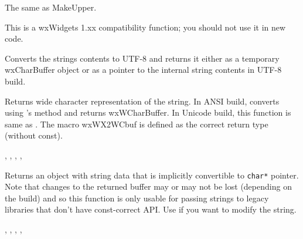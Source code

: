 The same as MakeUpper.

This is a wxWidgets 1.xx compatibility function; you should not use it in new code.


\label{wxstringutf8str}



Converts the strings contents to UTF-8 and returns it either as a temporary
wxCharBuffer object or as a pointer to the internal string contents in
UTF-8 build.


\label{wxstringwcstr}



Returns wide character representation of the string.
In ANSI build, converts using 's 
method and returns wxWCharBuffer. In Unicode build, this function is same
as .
The macro wxWX2WCbuf is defined as the correct return type (without const).


,
, ,
, 

\label{wxstringwcharstr}


Returns an object with string data that is implicitly convertible to
{\tt char*} pointer. Note that changes to the returned buffer may or may
not be lost (depending on the build) and so this function is only usable for
passing strings to legacy libraries that don't have const-correct API. Use
 if you want to modify the string.


, ,
, ,


\label{wxstringoperatornot}

